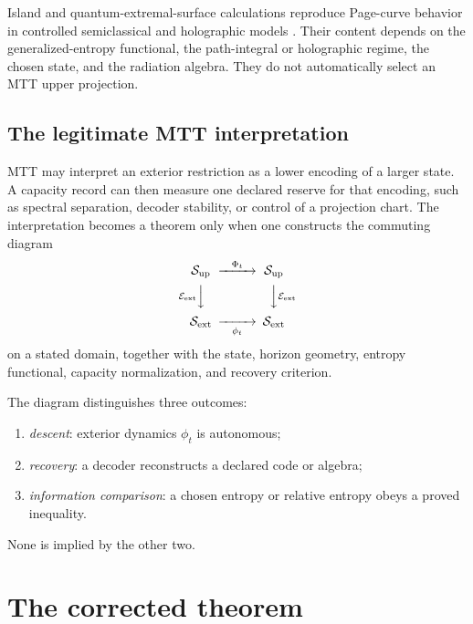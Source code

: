 \documentclass[11pt,a4paper]{article}
\numberwithin{equation}{section}
\theoremstyle{definition}
\theoremstyle{remark}
\newcommand{\cE}{\mathcal E}
\newcommand{\cS}{\mathcal S}
\begin{document}
Island and quantum-extremal-surface calculations reproduce Page-curve
behavior in controlled semiclassical and holographic models
\cite{Penington2020,AlmheiriEtAl2020}.  Their content depends on the
generalized-entropy functional, the path-integral or holographic regime,
the chosen state, and the radiation algebra.  They do not automatically
select an MTT upper projection.

\subsection{The legitimate MTT interpretation}

MTT may interpret an exterior restriction as a lower encoding of a larger
state.  A capacity record can then measure one declared reserve for that
encoding, such as spectral separation, decoder stability, or control of a
projection chart.  The interpretation becomes a theorem only when one
constructs the commuting diagram
\[
\begin{CD}
  \cS_{\mathrm{up}} @>{\Phi_t}>> \cS_{\mathrm{up}}\\
  @V{\cE_{\mathrm{ext}}}VV @VV{\cE_{\mathrm{ext}}}V\\
  \cS_{\mathrm{ext}} @>>{\phi_t}> \cS_{\mathrm{ext}}
\end{CD}
\]
on a stated domain, together with the state, horizon geometry, entropy
functional, capacity normalization, and recovery criterion.

The diagram distinguishes three outcomes:
\begin{enumerate}[leftmargin=2em]
\item \emph{descent}: exterior dynamics \(\phi_t\) is autonomous;
\item \emph{recovery}: a decoder reconstructs a declared code or algebra;
\item \emph{information comparison}: a chosen entropy or relative entropy
  obeys a proved inequality.
\end{enumerate}
None is implied by the other two.

\section{The corrected theorem}
\end{document}
